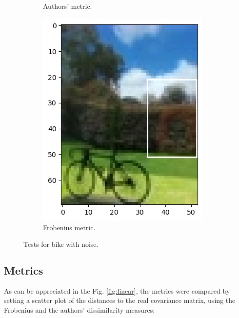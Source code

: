 \documentclass[11pt]{article}
\theoremstyle{definition}
\theoremstyle{remark}
\theoremstyle{remark}
\theoremstyle{remark}
\begin{document}
\begin{figure}[H]
\begin{subfigure}[b]{0.32\textwidth}
    \caption{Authors' metric.}
  \end{subfigure}
  \begin{subfigure}[b]{0.32\textwidth}
    \centering
    \includegraphics[width=\textwidth]{figs/0-4-1-test_case1.jpg}
    \caption{Frobenius metric.}
  \end{subfigure}
  \caption{Tests for bike with noise.}
  \label{fig:test_bike_lw}
\end{figure}

\subsection{Metrics}
As can be appreciated in the Fig. \ref{fig:linear}, the metrics were compared by setting a scatter plot of the distances to the real covariance matrix, using the Frobenius and the authors' dissimilarity measures:
\end{document}
